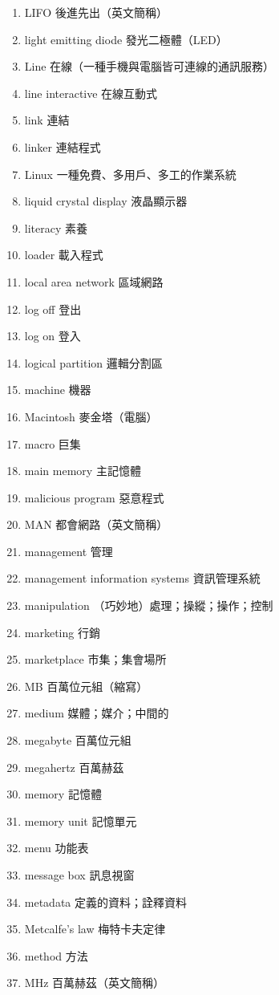 \begin{enumerate}
  \item LIFO 後進先出（英文簡稱）
  \item light emitting diode 發光二極體（LED）
  \item Line 在線（一種手機與電腦皆可連線的通訊服務）
  \item line interactive 在線互動式
  \item link 連結
  \item linker 連結程式
  \item Linux 一種免費、多用戶、多工的作業系統
  \item liquid crystal display 液晶顯示器
  \item literacy 素養
  \item loader 載入程式
  \item local area network 區域網路
  \item log off 登出
  \item log on 登入
  \item logical partition 邏輯分割區
  \item machine 機器
  \item Macintosh 麥金塔（電腦）
  \item macro 巨集
  \item main memory 主記憶體
  \item malicious program 惡意程式
  \item MAN 都會網路（英文簡稱）
  \item management 管理
  \item management information systems 資訊管理系統
  \item manipulation （巧妙地）處理；操縱；操作；控制
  \item marketing 行銷
  \item marketplace 市集；集會場所
  \item MB 百萬位元組（縮寫）
  \item medium 媒體；媒介；中間的
  \item megabyte 百萬位元組
  \item megahertz 百萬赫茲
  \item memory 記憶體
  \item memory unit 記憶單元
  \item menu 功能表
  \item message box 訊息視窗
  \item metadata 定義的資料；詮釋資料
  \item Metcalfe's law 梅特卡夫定律
  \item method 方法
  \item MHz 百萬赫茲（英文簡稱）

\end{enumerate}
